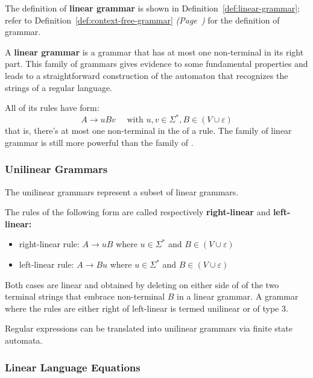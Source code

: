 \documentclass[english]{article}
\begin{document}
The definition of \textbf{linear grammar} is shown in Definition~\ref{def:linear-grammar};
refer to Definition~\ref{def:context-free-grammar} \textit{(Page~\pageref{def:context-free-grammar})} for the definition of \CF grammar.

\begin{definition}
  \label{def:linear-grammar}
  A \textbf{linear grammar} is a \CF grammar that has at most one non-terminal in its right part.
  This family of grammars gives evidence to some fundamental properties and leads to a straightforward construction of the automaton that recognizes the strings of a regular language.
\end{definition}

All of its rules have form:
\[A \rightarrow uBv \quad \text{ with } u, v \in \Sigma^\ast, B \in \left(V \cup \varepsilon\right) \]
that is, there's at most one non-terminal in the \RP of a rule.
The family of linear grammar is still more powerful than the family of \RE.

\subsubsection{Unilinear Grammars}

The unilinear grammars represent a subset of linear grammars.

The rules of the following form are called respectively \textbf{right-linear} and \textbf{left-linear:}

\begin{itemize}
  \item right-linear rule: \(A \rightarrow uB \) where \(u \in \Sigma^\ast\) and \(B \in \left( V \cup \varepsilon \right)\)
  \item left-linear rule: \(A \rightarrow Bu \) where \(u \in \Sigma^\ast\) and \(B \in \left( V \cup \varepsilon \right)\)
\end{itemize}

Both cases are linear and obtained by deleting on either side of of the two terminal strings that embrace non-terminal \(B\) in a linear grammar.
A grammar where the rules are either right of left-linear is termed unilinear or of type 3.

Regular expressions can be translated into unilinear grammars via finite state automata.

\subsubsection{Linear Language Equations}
\end{document}
